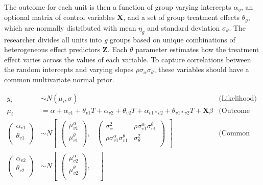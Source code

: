 \documentclass[12pt]{article}
\begin{document}
The outcome for each unit is then a function of group varying intercepts $\alpha_g$, an optional matrix of control variables \textbf{X}, and a set of group treatment effects $\theta_g$, which are normally distributed with mean $\eta_g$ and standard deviation $\sigma_\theta$. 
The researcher divides all units into \textit{g} groups based on unique combinations of heterogeneous effect predictors \textbf{Z}. 
Each $\theta$ parameter estimates how the treatment effect varies across the values of  each variable.  
To capture correlations between the random intercepts and varying slopes $\rho \sigma_\alpha \sigma_\theta$, these variables should have a common multivariate normal prior.


\begin{align*}
y_i &\sim N(\mu_i, \sigma) &\text{(Likelihood)} \\
\mu_i &= \alpha + \alpha_{v1} + \theta_{v1} \textit{T} + \alpha_{v2} + \theta_{v2} \textit{T} + \alpha_{v1*v2} + \theta_{v1*v2} \textit{T} + \textbf{X} \beta &\text{(Outcome Equation)}  \\ 
\begin{pmatrix} 
\alpha_{v1} \\
\theta_{v1} \\
\end{pmatrix} &\sim  N
\begin{bmatrix}
\begin{pmatrix}
\mu^\alpha_{v1} \\
\mu^\theta_{v1} \\
\end{pmatrix}\!\!,&
\begin{pmatrix}
\sigma^2_\alpha & \rho \sigma^\alpha_{v1} \sigma^\theta_{v1} \\
\rho \sigma^\alpha_{v1} \sigma^\theta_{v1} & \sigma^2_\theta \\
\end{pmatrix}
\end{bmatrix} & \text{(Common Prior: V1)} \\ 
\begin{pmatrix} 
\alpha_{v2} \\
\theta_{v2} \\
\end{pmatrix} &\sim  N
\begin{bmatrix}
\begin{pmatrix}
\mu^\alpha_{v2} \\
\mu^\theta_{v2} \\
\end{pmatrix}\!\!,&

\end{bmatrix}
\end{align*}
\end{document}
